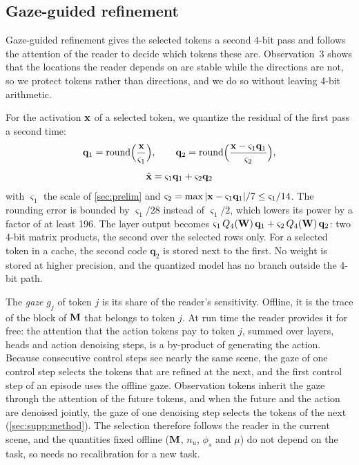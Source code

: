 \subsection{Gaze-guided refinement}
\label{sec:method:refine}

Gaze-guided refinement gives the selected tokens a second 4-bit pass and follows the attention of the reader to decide which tokens these are.
Observation~3 shows that the locations the reader depends on are stable while the directions are not, so we protect tokens rather than directions, and we do so without leaving 4-bit arithmetic.

For the activation $\mathbf{x}$ of a selected token, we quantize the residual of the first pass a second time:
\begin{equation}
  \begin{gathered}
    \mathbf{q}_1 = \operatorname{round}\!\Big(\frac{\mathbf{x}}{\varsigma_1}\Big), \qquad
    \mathbf{q}_2 = \operatorname{round}\!\Big(\frac{\mathbf{x} - \varsigma_1 \mathbf{q}_1}{\varsigma_2}\Big), \\[4pt]
    \hat{\mathbf{x}} = \varsigma_1 \mathbf{q}_1 + \varsigma_2 \mathbf{q}_2
  \end{gathered}
  \label{eq:refine}
\end{equation}
with $\varsigma_1$ the scale of \cref{sec:prelim} and $\varsigma_2 = \max|\mathbf{x} - \varsigma_1 \mathbf{q}_1| / 7 \le \varsigma_1 / 14$.
The rounding error is bounded by $\varsigma_1/28$ instead of $\varsigma_1/2$, which lowers its power by a factor of at least 196.
The layer output becomes $\varsigma_1\, Q_4(\mathbf{W})\,\mathbf{q}_1 + \varsigma_2\, Q_4(\mathbf{W})\,\mathbf{q}_2$: two 4-bit matrix products, the second over the selected rows only.
For a selected token in a cache, the second code $\mathbf{q}_2$ is stored next to the first.
No weight is stored at higher precision, and the quantized model has no branch outside the 4-bit path.

The \emph{gaze} $g_j$ of token $j$ is its share of the reader's sensitivity.
Offline, it is the trace of the block of $\mathbf{M}$ that belongs to token $j$.
At run time the reader provides it for free: the attention that the action tokens pay to token $j$, summed over layers, heads and action denoising steps, is a by-product of generating the action.
Because consecutive control steps see nearly the same scene, the gaze of one control step selects the tokens that are refined at the next, and the first control step of an episode uses the offline gaze.
Observation tokens inherit the gaze through the attention of the future tokens, and when the future and the action are denoised jointly, the gaze of one denoising step selects the tokens of the next (\cref{sec:supp:method}).
The selection therefore follows the reader in the current scene, and the quantities fixed offline ($\mathbf{M}$, $n_u$, $\phi_s$ and $\mu$) do not depend on the task, so \method needs no recalibration for a new task.

